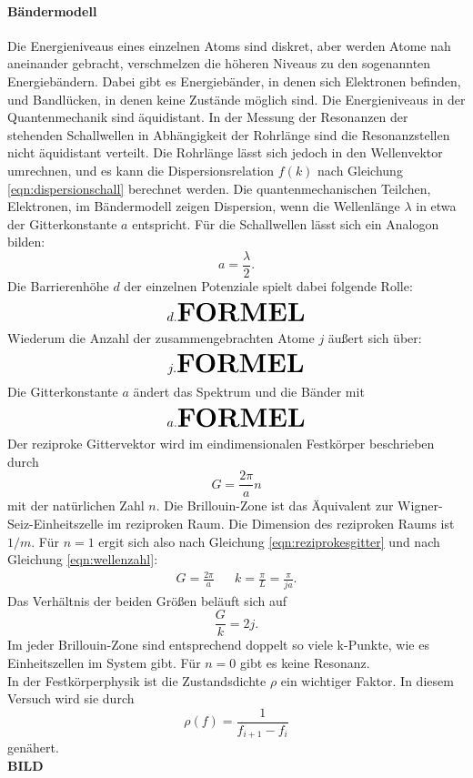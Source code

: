 \paragraph{Bändermodell}
Die Energieniveaus eines einzelnen Atoms sind diskret, aber werden Atome nah aneinander gebracht, verschmelzen die höheren Niveaus zu den sogenannten Energiebändern.
Dabei gibt es Energiebänder, in denen sich Elektronen befinden, und Bandlücken, in denen keine Zustände möglich sind.
Die Energieniveaus in der Quantenmechanik sind äquidistant.
In der Messung der Resonanzen der stehenden Schallwellen in Abhängigkeit der Rohrlänge sind die Resonanzstellen nicht äquidistant verteilt.
Die Rohrlänge lässt sich jedoch in den Wellenvektor umrechnen, und es kann die Dispersionsrelation $f(k)$ nach Gleichung \eqref{eqn:dispersionschall} berechnet werden.
Die quantenmechanischen Teilchen, Elektronen, im Bändermodell zeigen Dispersion, wenn die Wellenlänge $\lambda$ in etwa der Gitterkonstante $a$ entspricht.
Für die Schallwellen lässt sich ein Analogon bilden:
\begin{equation}
  a = \frac{\lambda}{2}.
\end{equation}
Die Barrierenhöhe $d$ der einzelnen Potenziale spielt dabei folgende Rolle:
\begin{equation}
  d. \textbf{\huge{FORMEL}}
\end{equation}
Wiederum die Anzahl der zusammengebrachten Atome $j$ äußert sich über:
\begin{equation}
  j. \huge{\textbf{FORMEL}}
\end{equation}
Die Gitterkonstante $a$ ändert das Spektrum und die Bänder mit
\begin{equation}
  a. \huge{\textbf{FORMEL}}
\end{equation}
Der reziproke Gittervektor wird im eindimensionalen Festkörper beschrieben durch
\begin{equation}
  G= \frac{2 \pi }{a} n
  \label{eqn:reziprokesgitter}
\end{equation}
mit der natürlichen Zahl $n$.
Die Brillouin-Zone ist das Äquivalent zur Wigner-Seiz-Einheitszelle im reziproken Raum.
Die Dimension des reziproken Raums ist $\si{1/m}$.
Für $n=1$ ergit sich also nach Gleichung \eqref{eqn:reziprokesgitter} und nach Gleichung \eqref{eqn:wellenzahl}:
\begin{align}
  G= \frac{2 \pi }{a}  && k = \frac{ \pi }{L} = \frac{\pi}{ j a}.
  \label{eqn:unsergitter}
\end{align}
Das Verhältnis der beiden Größen beläuft sich auf
\begin{equation*}
  \frac{G}{k} = 2 j.
\end{equation*}
Im jeder Brillouin-Zone sind entsprechend doppelt so viele k-Punkte, wie es Einheitszellen im System gibt.
Für $n=0$ gibt es keine Resonanz.\\
In der Festkörperphysik ist die Zustandsdichte $\rho$ ein wichtiger Faktor.
In diesem Versuch wird sie durch
\begin{equation}
  \rho(f) = \frac{1}{f_{i+1}-f_{i}}
  \label{eqn:zustandsdichte}
\end{equation}
genähert.
\\\textbf{\huge{BILD}}
%
